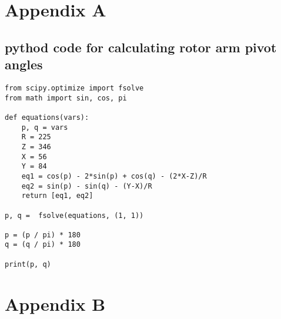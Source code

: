 \documentclass[11pt]{article}
\begin{document}
\section*{Appendix A}
\subsection*{pythod code for calculating rotor arm pivot angles}

\tiny
\begin{lstlisting}
from scipy.optimize import fsolve
from math import sin, cos, pi

def equations(vars):
    p, q = vars
    R = 225
    Z = 346
    X = 56
    Y = 84
    eq1 = cos(p) - 2*sin(p) + cos(q) - (2*X-Z)/R
    eq2 = sin(p) - sin(q) - (Y-X)/R
    return [eq1, eq2]

p, q =  fsolve(equations, (1, 1))

p = (p / pi) * 180
q = (q / pi) * 180

print(p, q)
\end{lstlisting}


\normalsize
\newpage
\section*{Appendix B}
\end{document}
